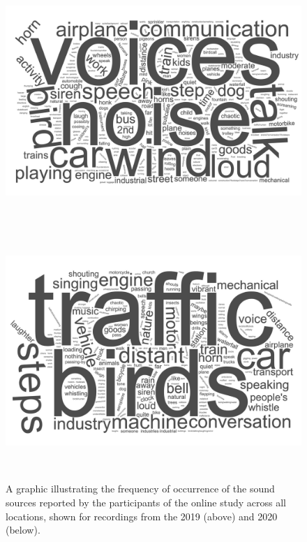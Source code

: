 \documentclass[
  authoryear,
  preprint,
  3p,
  onecolumn]{elsarticle}
\begin{document}
\begin{figure}

\begin{minipage}{0.25\linewidth}
~\end{minipage}%
%
\begin{minipage}{0.50\linewidth}
\includegraphics{Figure3a.jpg}\end{minipage}%
%
\begin{minipage}{0.25\linewidth}
~\end{minipage}%
\newline
\begin{minipage}{0.25\linewidth}
~\end{minipage}%
%
\begin{minipage}{0.50\linewidth}
\includegraphics{Figure3b.jpg}\end{minipage}%
%
\begin{minipage}{0.25\linewidth}
~\end{minipage}%

\caption{\label{fig-wordclo}A graphic illustrating the frequency of
occurrence of the sound sources reported by the participants of the
online study across all locations, shown for recordings from the 2019
(above) and 2020 (below).}

\end{figure}%
\end{document}
